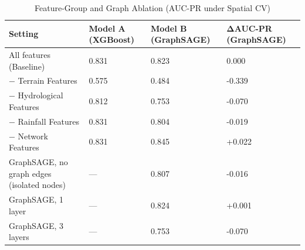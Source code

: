 \begin{table}
\caption{Feature-Group and Graph Ablation (AUC-PR under Spatial CV)}
\label{tab:ablation}
\begin{tabular}{llll}
\toprule
Setting & Model A (XGBoost) & Model B (GraphSAGE) & ΔAUC-PR (GraphSAGE) \\
\midrule
All features (Baseline) & 0.831 & 0.823 & 0.000 \\
− Terrain Features & 0.575 & 0.484 & -0.339 \\
− Hydrological Features & 0.812 & 0.753 & -0.070 \\
− Rainfall Features & 0.831 & 0.804 & -0.019 \\
− Network Features & 0.831 & 0.845 & +0.022 \\
GraphSAGE, no graph edges (isolated nodes) & — & 0.807 & -0.016 \\
GraphSAGE, 1 layer & — & 0.824 & +0.001 \\
GraphSAGE, 3 layers & — & 0.753 & -0.070 \\
\bottomrule
\end{tabular}
\end{table}
